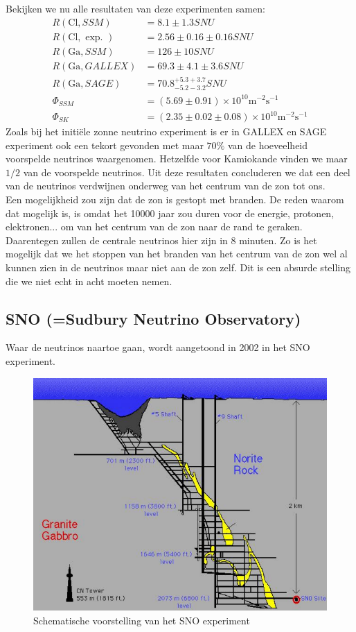 \documentclass[../main.tex]{subfiles}
\begin{document}
Bekijken we nu alle resultaten van deze experimenten samen:
\begin{equation}
    \begin{aligned}
        \label{eq:zonne_neutrino_resultaten}
        R(\mathrm{Cl}, S S M) &=8.1 \pm 1.3 S N U \\
        R(\mathrm{Cl}, \text { exp. }) &=2.56 \pm 0.16 \pm 0.16 S N U \\
        R(\mathrm{Ga}, S S M) &=126 \pm 10 S N U \\
        R(\mathrm{Ga}, G A L L E X) &=69.3 \pm 4.1 \pm 3.6 S N U \\
        R(\mathrm{Ga}, S A G E) &=70.8_{-5.2-3.2}^{+5.3+3.7} S N U \\
        \Phi_{S S M} &=(5.69 \pm 0.91) \times 10^{10} \text{m}^{-2} \text{s}^{-1} \\
        \Phi_{S K} &=(2.35 \pm 0.02 \pm 0.08) \times 10^{10} \text{m}^{-2} \text{s}^{-1}
    \end{aligned}
\end{equation}
Zoals bij het initiële zonne neutrino experiment is er in GALLEX en SAGE experiment ook een tekort gevonden met maar $70\%$ van de hoeveelheid voorspelde neutrinos waargenomen. Hetzelfde voor Kamiokande vinden we maar $1/2$ van de voorspelde neutrinos. Uit deze resultaten concluderen we dat een deel van de neutrinos verdwijnen onderweg van het centrum van de zon tot ons.\\
Een mogelijkheid zou zijn dat de zon is gestopt met branden. De reden waarom dat mogelijk is, is omdat het 10000 jaar zou duren voor de energie, protonen, elektronen... om van het centrum van de zon naar de rand te geraken. Daarentegen zullen de centrale neutrinos hier zijn in 8 minuten. Zo is het mogelijk dat we het stoppen van het branden van het centrum van de zon wel al kunnen zien in de neutrinos maar niet aan de zon zelf. Dit is een absurde stelling die we niet echt in acht moeten nemen.

\subsection{SNO (=Sudbury Neutrino Observatory)}%
\label{sub:sno}

Waar de neutrinos naartoe gaan, wordt aangetoond in 2002 in het SNO experiment.

\begin{figure}[h]
    \centering
    \includegraphics[width=0.5\linewidth]{neutrinos/sno_schematisch.png}
    \caption{Schematische voorstelling van het SNO experiment}%
    \label{fig:neutrinos/sno_schematisch}
\end{figure}
\end{document}
